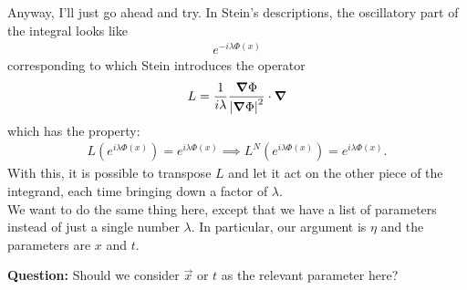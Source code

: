 \documentclass{article}
\theoremstyle{definition}
\newcommand{\f}[2]{\frac{#1}{#2}}
\newcommand{\lp}{\left(}
\newcommand{\rp}{\right)}
\begin{document}
Anyway, I'll just go ahead and try. In Stein's descriptions, the oscillatory part of the integral looks like 
\begin{align*}
    e^{-i \lambda \Phi(x)}
\end{align*}
corresponding to which Stein introduces the operator 
\begin{align*}
    L = \f{1}{i\lambda}\f{\grad \Phi}{\abs{\grad \Phi}^2} \cdot \grad
\end{align*}
which has the property:
\begin{align*}
    L\lp e^{i \lambda \Phi(x)} \rp = e^{i \lambda \Phi(x)} \implies L^N\lp e^{i \lambda \Phi(x)} \rp = e^{i \lambda \Phi(x)}.
\end{align*}
With this, it is possible to transpose $L$ and let it act on the other piece of the integrand, each time bringing down a factor of $\lambda$. \\

We want to do the same thing here, except that we have a list of parameters instead of just a single number $\lambda$. In particular, our argument is $\eta$ and the parameters are $x$ and $t$. 

\begin{framed}
\noindent \textbf{Question:} Should we consider $\vec{x}$ or $t$ as the relevant parameter here? 
\end{framed}
\end{document}

